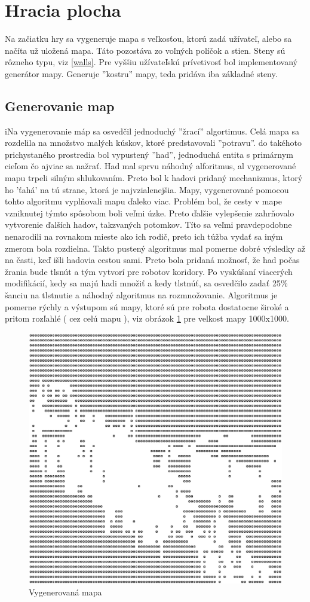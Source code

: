 \section{Hracia plocha} %
Na začiatku hry sa vygeneruje mapa s veľkosťou, ktorú zadá užívateľ, alebo sa načíta už uložená mapa. Táto pozostáva zo voľných políčok a stien. Steny sú rôzneho typu, viz \ref{walls}. Pre vyššiu užívateľskú prívetivosť bol implementovaný generátor mapy. Generuje ''kostru'' mapy, teda pridáva iba základné steny.
\subsection{Generovanie map}%
iNa vygenerovanie máp sa osvedčil jednoduchý ''žrací'' algortimus. Celá mapa sa rozdelila na množstvo malých kúskov, ktoré predstavovali ''potravu''. do takéhoto prichystaného prostredia bol vypustený ''had'', jednoduchá entita s primárnym cieľom čo ajviac sa nažrať. Had mal sprvu náhodný alforitmus, al vygenerované mapu trpeli silným shlukovaním. Preto bol k hadovi pridaný mechanizmus, ktorý ho 'ťahá' na tú strane, ktorá je najvzialenejšia. Mapy, vygenerované pomocou tohto algoritmu vyplňovali mapu ďaleko viac. Problém bol, že cesty v mape vzniknutej týmto spôsobom boli veľmi úzke. Preto ďalšie vylepšenie zahrňovalo vytvorenie ďalších hadov, takzvaných potomkov. Títo sa veľmi pravdepodobne nenarodili na rovnakom mieste ako ich rodič, preto ich túžba vydať sa iným zmerom bola rozdielna. Takto pustený algoritmus mal pomerne dobré výsledky až na časti, keď išli hadovia cestou sami. Preto bola pridaná možnosť, že had počas žrania bude tlsnút a tým  vytvorí pre robotov koridory. Po vyskúšaní viacerých modifikácií, kedy sa majú hadi množiť a kedy tlstnúť, sa osvedčilo zadať 25\% šanciu na tlstnutie a náhodný algoritmus na rozmnožovanie. Algoritmus je pomerne rýchly a výstupom sú mapy, ktoré sú pre robota dostatocne široké a pritom rozľahlé ( cez celú mapu ), viz obrázok \ref{fig:mapa} pre velkost mapy 1000x1000.
\begin{figure}
\centering
\includegraphics[totalheight=0.2\textheight,width=.6\textwidth]{mapa}
\caption {Vygenerovaná mapa}
\label{fig:mapa}
\end{figure}
